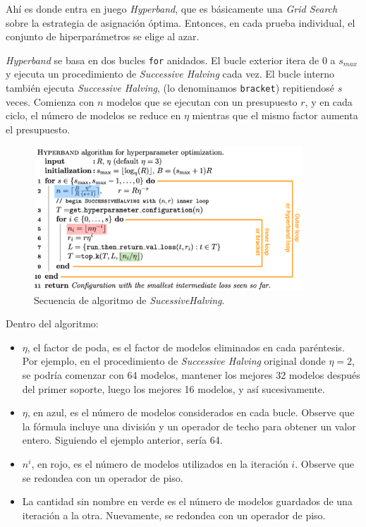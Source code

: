 \documentclass[a4paper,12pt]{article}
\begin{document}
Ahí es donde entra en juego \textit{Hyperband}, que es básicamente una \textit{Grid Search} sobre la estrategia de asignación óptima. Entonces, en cada prueba individual, el conjunto de hiperparámetros se elige al azar.

\textit{Hyperband} se basa en dos bucles \texttt{for} anidados. El bucle exterior itera de $0$ a $s_{max}$ y ejecuta un procedimiento de \textit{Successive Halving} cada vez. El bucle interno también ejecuta \textit{Successive Halving}, (lo denominamos \texttt{bracket}) repitiendosé $s$ veces. Comienza con $n$ modelos que se ejecutan con un presupuesto $r$, y en cada ciclo, el número de modelos se reduce en $\eta$ mientras que el mismo factor aumenta el presupuesto. \citep{Abraham2021Feb}

\begin{figure}[H]
	\begin{center}
	\includegraphics[width=0.9\textwidth]{hyperband_algo.png}
  	\caption{Secuencia de algoritmo de \textit{SucessiveHalving}.}
  	\label{fig:hyper_algo}
  	\end{center}
\end{figure}

Dentro del algoritmo:
\begin{itemize}
	\item $\eta$, el factor de poda, es el factor de modelos eliminados en cada paréntesis. Por ejemplo, en el procedimiento de \textit{Successive Halving} original donde $\eta = 2$, se podría comenzar con 64 modelos, mantener los mejores 32 modelos después del primer soporte, luego los mejores 16 modelos, y así sucesivamente.
	\item $\eta$, en azul, es el número de modelos considerados en cada bucle. Observe que la fórmula incluye una división y un operador de techo para obtener un valor entero. Siguiendo el ejemplo anterior, sería 64.
	\item $n^i$, en rojo, es el número de modelos utilizados en la iteración $i$. Observe que se redondea con un operador de piso.
	\item La cantidad sin nombre en verde es el número de modelos guardados de una iteración a la otra. Nuevamente, se redondea con un operador de piso.
\end{itemize}
\end{document}

